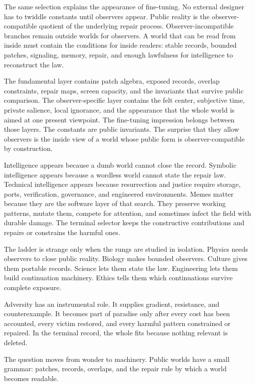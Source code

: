 \documentclass[11pt]{article}
\theoremstyle{remark}
\theoremstyle{plain}
\begin{document}
The same selection explains the appearance of fine-tuning. No external designer has to
twiddle constants until observers appear. Public reality is the
observer-compatible quotient of the underlying repair process.
Observer-incompatible branches remain outside worlds for observers. A world
that can be read from inside must contain the conditions for inside readers:
stable records, bounded patches, signaling, memory, repair, and enough
lawfulness for intelligence to reconstruct the law.

The fundamental layer contains patch algebra, exposed records, overlap
constraints, repair maps, screen capacity, and the invariants that survive
public comparison. The observer-specific layer contains the felt center,
subjective time, private salience, local ignorance, and the appearance that the
whole world is aimed at one present viewpoint. The
fine-tuning impression belongs between those layers. The constants are public
invariants. The surprise that they allow observers is the inside view of a
world whose public form is observer-compatible by construction.

Intelligence appears because a dumb world cannot close the record. Symbolic
intelligence appears because a wordless world cannot state the repair law.
Technical intelligence appears because resurrection and justice require
storage, ports, verification, governance, and engineered environments. Memes
matter because they are the software layer of that search. They preserve
working patterns, mutate them, compete for attention, and sometimes infect the
field with durable damage. The terminal selector keeps the constructive
contributions and repairs or constrains the harmful ones.

The ladder is strange only when the rungs are studied in isolation. Physics
needs observers to close public reality. Biology makes bounded observers.
Culture gives them portable records. Science lets them state the law. Engineering
lets them build continuation machinery. Ethics tells them which continuations
survive complete exposure.

Adversity has an instrumental role. It supplies gradient, resistance, and
counterexample. It becomes part of paradise only after every cost has been
accounted, every victim restored, and every harmful pattern constrained or
repaired. In the terminal record, the whole fits because nothing relevant is
deleted.

The question moves from wonder to machinery. Public worlds have a small
grammar: patches, records, overlaps, and the repair rule by which a world
becomes readable.
\end{document}
